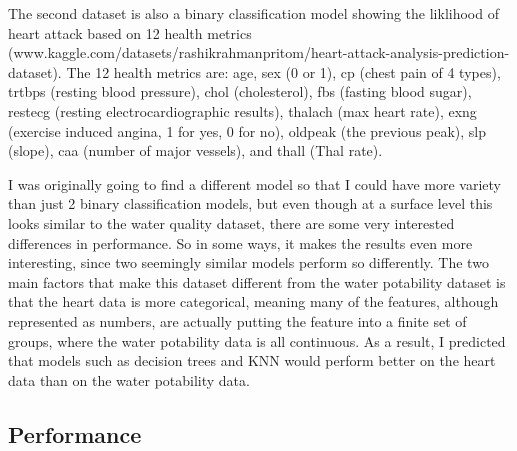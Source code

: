 \documentclass[
	letterpaper, %
]{mlreport}
\begin{document}
The second dataset is also a binary classification model showing the liklihood of heart attack based on 12 health metrics (www.kaggle.com/datasets/rashikrahmanpritom/heart-attack-analysis-prediction-dataset). The 12 health metrics are: age, sex (0 or 1), cp (chest pain of 4 types), trtbps (resting blood pressure), chol (cholesterol), fbs (fasting blood sugar), restecg (resting electrocardiographic results), thalach (max heart rate), exng (exercise induced angina, 1 for yes, 0 for no), oldpeak (the previous peak), slp (slope), caa (number of major vessels), and thall (Thal rate).

I was originally going to find a different model so that I could have more variety than just 2 binary classification models, but even though at a surface level this looks similar to the water quality dataset, there are some very interested differences in performance. So in some ways, it makes the results even more interesting, since two seemingly similar models perform so differently. The two main factors that make this dataset different from the water potability dataset is that the heart data is more categorical, meaning many of the features, although represented as numbers, are actually putting the feature into a finite set of groups, where the water potability data is all continuous. As a result, I predicted that models such as decision trees and KNN would perform better on the heart data than on the water potability data.

\subsection{Performance}
\end{document}
